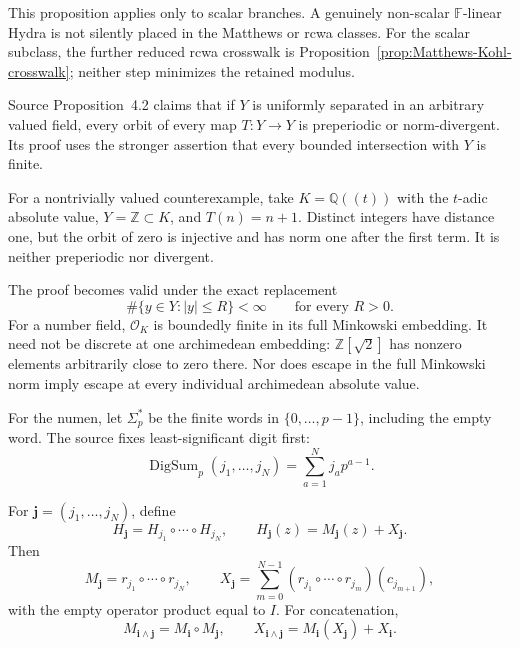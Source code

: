 This proposition applies only to scalar branches.  A genuinely non-scalar
$\mathbb F$-linear Hydra is not silently placed in the Matthews or rcwa
classes.  For the scalar subclass, the further reduced rcwa crosswalk is
Proposition~\ref{prop:Matthews-Kohl-crosswalk}; neither step minimizes the
retained modulus.

\begin{sourceissue}
\label{issue:Siegel-discrete-orbit-classification}
Source Proposition~4.2 claims that if $Y$ is uniformly separated in an
arbitrary valued field, every orbit of every map $T:Y\to Y$ is preperiodic or
norm-divergent.  Its proof uses the stronger assertion that every bounded
intersection with $Y$ is finite.

For a nontrivially valued counterexample, take $K=\mathbb Q((t))$ with the
$t$-adic absolute value, $Y=\mathbb Z\subset K$, and $T(n)=n+1$.  Distinct
integers have distance one, but the orbit of zero is injective and has norm
one after the first term.  It is neither preperiodic nor divergent.

The proof becomes valid under the exact replacement
\[
 \#\{y\in Y:|y|\leq R\}<\infty
 \qquad\text{for every }R>0.
\tag{BF}
\]
For a number field, $\mathcal O_K$ is boundedly finite in its full Minkowski
embedding.  It need not be discrete at one archimedean embedding:
$\mathbb Z[\sqrt2]$ has nonzero elements arbitrarily close to zero there.
Nor does escape in the full Minkowski norm imply escape at every individual
archimedean absolute value.
\end{sourceissue}

For the numen, let $\Sigma_p^*$ be the finite words in
$\{0,\ldots,p-1\}$, including the empty word.  The source fixes
least-significant digit first:
\[
 \operatorname{DigSum}_p(j_1,\ldots,j_N)
 =\sum_{a=1}^{N}j_a p^{a-1}.
\]

\begin{proposition}
\label{prop:Siegel-word-numen}
For $\mathbf j=(j_1,\ldots,j_N)$, define
\[
 H_{\mathbf j}=H_{j_1}\circ\cdots\circ H_{j_N},
 \qquad
 H_{\mathbf j}(z)=M_{\mathbf j}(z)+X_{\mathbf j}.
\]
Then
\[
 M_{\mathbf j}=r_{j_1}\circ\cdots\circ r_{j_N},
 \qquad
 X_{\mathbf j}
 =\sum_{m=0}^{N-1}
   (r_{j_1}\circ\cdots\circ r_{j_m})(c_{j_{m+1}}),
\tag{W}
\label{eq:Siegel-word-formula}
\]
with the empty operator product equal to $I$.  For concatenation,
\[
 M_{\mathbf i\wedge\mathbf j}
 =M_{\mathbf i}\circ M_{\mathbf j},
 \qquad
 X_{\mathbf i\wedge\mathbf j}
 =M_{\mathbf i}(X_{\mathbf j})+X_{\mathbf i}.
\tag{C}
\label{eq:Siegel-word-cocycle}
\]
\end{proposition}

